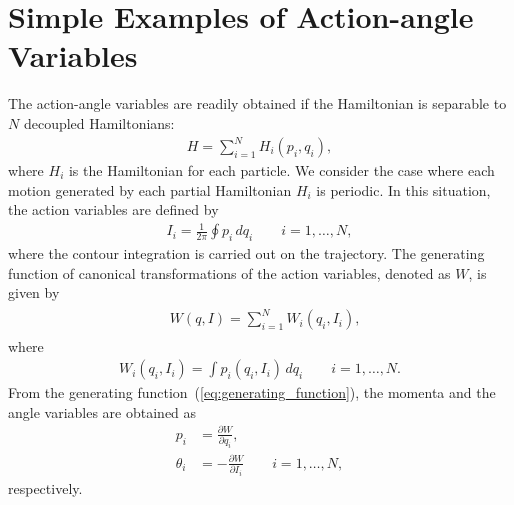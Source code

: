 \section{Simple Examples of Action-angle Variables}
The action-angle variables are readily obtained if the Hamiltonian is separable to $N$ decoupled Hamiltonians:
\begin{align}
  H = \sum_{i=1}^{N} H_i(p_i,q_i),
\end{align}
where $H_i$  is the Hamiltonian for each particle.
We consider the case where each motion generated by each partial Hamiltonian $H_i$ is periodic.
In this situation, the action variables are defined by
\begin{align}
  I_i = \frac{1}{2\pi}\oint p_i \, dq_i \qquad{i=1,\ldots,N}, \label{eq:action_variables_circle}
\end{align}
where the contour integration is carried out on the trajectory.
The generating function of canonical transformations of the action variables, denoted as $W$, is given by
\begin{align}
  \begin{split}
    & W(q, I)  = \sum_{i=1}^N W_i(q_i,I_i),
  \end{split}
  \label{eq:generating_function}
\end{align}
where
\begin{align}
  W_i(q_i,I_i) = \int p_i(q_i, I_i) \, dq_i  \qquad{i=1,\ldots,N}.
\end{align}
From the generating function~(\ref{eq:generating_function}), the momenta and the angle variables are obtained as
\begin{align}
  p_i &= \frac{\partial W}{\partial q_i}, \\
  \theta_i &= -\frac{\partial W}{\partial I_i}  \qquad{i=1,\ldots,N},
\end{align}
respectively.

